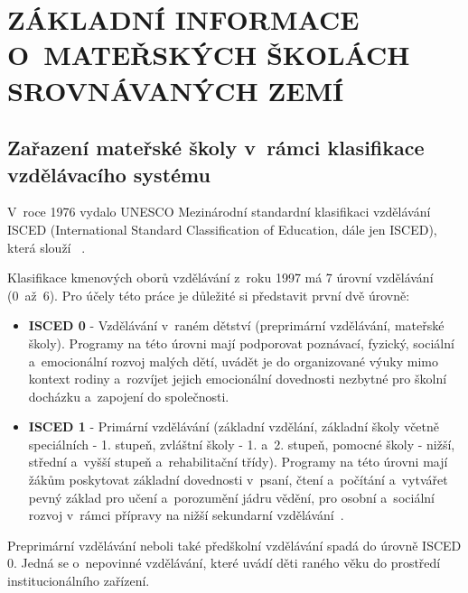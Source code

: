
\chapter[ZÁKLADNÍ INFORMACE O~MATEŘSKÝCH ŠKOLÁCH\\ SROVNÁVANÝCH ZEMÍ]{ZÁKLADNÍ INFORMACE O~MATEŘSKÝCH ŠKOLÁCH SROVNÁVANÝCH ZEMÍ}

	\section{Zařazení mateřské školy v~rámci klasifikace vzdělávacího systému}

		V roce 1976 vydalo UNESCO Mezinárodní standardní klasifikaci vzdělávání ISCED (International Standard Classification of Education, dále jen ISCED), která slouží \textit{}~\citep{ISCED2}.

\noindent
		Klasifikace kmenových oborů vzdělávání z roku 1997 má 7 úrovní vzdělávání (0~až~6).
		Pro účely této práce je důležité si představit první dvě úrovně:

\begin{itemize}
	\setlength\itemsep{-2mm}
	\item [] \textbf{ISCED 0} - Vzdělávání v~raném dětství (preprimární vzdělávání, mateřské školy). Programy na této úrovni mají podporovat poznávací, fyzický, sociální a~emocionální rozvoj malých dětí, uvádět je do organizované výuky mimo kontext rodiny a~rozvíjet jejich emocionální dovednosti nezbytné pro školní docházku a~zapojení do společnosti. 
	\item [] \textbf{ISCED 1} - Primární vzdělávání (základní vzdělání, základní školy včetně speciálních - 1. stupeň, zvláštní školy - 1. a~2. stupeň, pomocné školy - nižší, střední a~vyšší stupeň a~rehabilitační třídy). Programy na této úrovni mají žákům poskytovat základní dovednosti v~psaní, čtení a~počítání a~vytvářet pevný základ pro učení a~porozumění jádru vědění, pro osobní a~sociální rozvoj v~rámci přípravy na nižší sekundarní vzdělávání~\citep{ISCED}.
\end{itemize}

		Preprimární vzdělávání neboli také předškolní vzdělávání spadá do úrovně ISCED 0. Jedná se o~nepovinné vzdělávání, které uvádí děti raného věku do prostředí institucionálního zařízení. 

